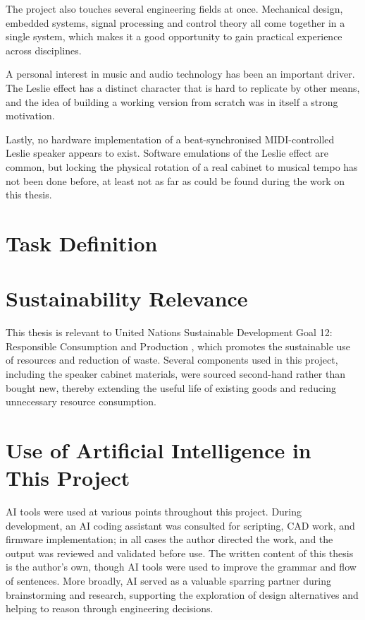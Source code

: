 The project also touches several engineering fields at once. Mechanical design, embedded systems, signal processing and control theory all come together in a single system, which makes it a good opportunity to gain practical experience across disciplines.

A personal interest in music and audio technology has been an important driver. The Leslie effect has a distinct character that is hard to replicate by other means, and the idea of building a working version from scratch was in itself a strong motivation.

Lastly, no hardware implementation of a beat-synchronised MIDI-controlled Leslie speaker appears to exist. Software emulations of the Leslie effect are common, but locking the physical rotation of a real cabinet to musical tempo has not been done before, at least not as far as could be found during the work on this thesis.

\section{Task Definition}

\section{Sustainability Relevance}
This thesis is relevant to United Nations Sustainable Development Goal 12: Responsible Consumption and Production \citep{un_sdg12}, which promotes the sustainable use of resources and reduction of waste. Several components used in this project, including the speaker cabinet materials, were sourced second-hand rather than bought new, thereby extending the useful life of existing goods and reducing unnecessary resource consumption.

\section{Use of Artificial Intelligence in This Project}
AI tools were used at various points throughout this project. During development, an AI coding assistant was consulted for scripting, CAD work, and firmware implementation; in all cases the author directed the work, and the output was reviewed and validated before use. The written content of this thesis is the author's own, though AI tools were used to improve the grammar and flow of sentences. More broadly, AI served as a valuable sparring partner during brainstorming and research, supporting the exploration of design alternatives and helping to reason through engineering decisions.


\cleardoublepage

